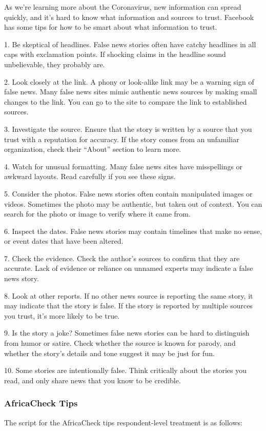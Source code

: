 \documentclass[letterpaper, 12pt, parskip=full,]{scrartcl}
\begin{document}
As we're learning more about the Coronavirus, new information can spread quickly, and it's hard to know what information and sources to trust. Facebook has some tips for how to be smart about what information to trust. 

1. Be skeptical of headlines. False news stories often have catchy headlines in all caps with exclamation points. If shocking claims in the headline sound unbelievable, they probably are.

2. Look closely at the link. A phony or look-alike link may be a warning sign of false news. Many false news sites mimic authentic news sources by making small changes to the link. You can go to the site to compare the link to established sources.

3. Investigate the source. Ensure that the story is written by a source that you trust with a reputation for accuracy. If the story comes from an unfamiliar organization, check their ``About'' section to learn more.

4. Watch for unusual formatting. Many false news sites have misspellings or awkward layouts. Read carefully if you see these signs.

5. Consider the photos. False news stories often contain manipulated images or videos. Sometimes the photo may be authentic, but taken out of context. You can search for the photo or image to verify where it came from.

6. Inspect the dates. False news stories may contain timelines that make no sense, or event dates that have been altered.

7. Check the evidence. Check the author's sources to confirm that they are accurate. Lack of evidence or reliance on unnamed experts may indicate a false news story.

8. Look at other reports. If no other news source is reporting the same story, it may indicate that the story is false. If the story is reported by multiple sources you trust, it's more likely to be true.

9. Is the story a joke? Sometimes false news stories can be hard to distinguish from humor or satire. Check whether the source is known for parody, and whether the story's details and tone suggest it may be just for fun.

10. Some stories are intentionally false. Think critically about the stories you read, and only share news that you know to be credible.



\subsubsection{AfricaCheck Tips}\label{sec:actips}
The script for the AfricaCheck tips respondent-level treatment is as follows:
\end{document}
